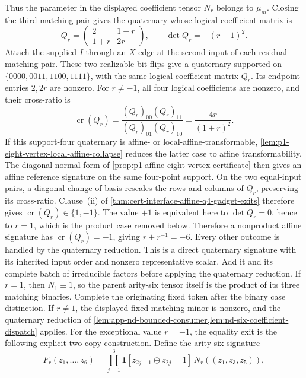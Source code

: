 \documentclass[11pt,letterpaper,onecolumn]{article}
\theoremstyle{plain}
\theoremstyle{definition}
\theoremstyle{remark}
\newcommand{\one}{\mathbf 1}
\begin{document}
Thus the parameter in the displayed coefficient tensor \(N_r\) belongs to
\(\mu_m\).
Closing the third matching pair gives the quaternary whose logical
coefficient matrix is
\hypertarget{eq:app-nd-Qr}{}
\begin{equation*}
  Q_r=
  \begin{pmatrix}
    2&1+r\\
    1+r&2r
  \end{pmatrix},
  \qquad
  \det Q_r=-(r-1)^2.
\end{equation*}
Attach the supplied \(I\) through an \(X\)-edge at the second input of
each residual matching pair. These two realizable bit flips give a
quaternary supported on \(\{0000,0011,1100,1111\}\), with the same
logical coefficient matrix \(Q_r\). Its endpoint entries \(2,2r\) are
nonzero. For \(r\ne-1\), all four logical coefficients are nonzero, and
their cross-ratio is
\[
 \operatorname{cr}(Q_r)=\frac{(Q_r)_{00}(Q_r)_{11}}
                 {(Q_r)_{01}(Q_r)_{10}}
          =\frac{4r}{(1+r)^2}.
\]
If this support-four quaternary is affine- or local-affine-transformable,
\cref{lem:p1-eight-vertex-local-affine-collapse} reduces the latter case
to affine transformability. The diagonal normal form of
\cref{prop:p1-affine-eight-vertex-certificate} then gives an affine
reference signature on the same four-point support. On the two equal-input
pairs, a diagonal change of basis rescales the rows and columns of
\(Q_r\), preserving its cross-ratio. Clause~\textnormal{(ii)} of
\cref{thm:cert-interface-affine-q4-gadget-exits} therefore gives
\(\operatorname{cr}(Q_r)\in\{1,-1\}\).
The value \(+1\) is equivalent here to
\(\det Q_r=0\), hence to \(r=1\), which is the product case removed below.
Therefore a nonproduct affine signature has \(\operatorname{cr}(Q_r)=-1\), giving
\(r+r^{-1}=-6\).  Every other outcome is handled by the quaternary reduction.
This is a direct quaternary signature with its inherited input order and nonzero
representative scalar.  Add it and its complete batch of irreducible factors
before applying the quaternary reduction.  If \(r=1\), then
\(N_1\equiv1\), so the parent arity-six tensor itself is the product of its
three matching binaries. Complete the originating fixed token after the
binary case distinction.  If \(r\ne1\), the displayed fixed-matching minor is
nonzero, and the quaternary reduction of
\cref{lem:app-nd-bounded-consumer,lem:nd-six-coefficient-dispatch} applies.
For the exceptional value \(r=-1\), the equality exit is the
following explicit two-copy construction.  Define the arity-six signature
\[
 F_r(z_1,\ldots,z_6)=
 \prod_{j=1}^3\one[z_{2j-1}\oplus z_{2j}=1]\,N_r((z_1,z_3,z_5)),
\]
\end{document}
